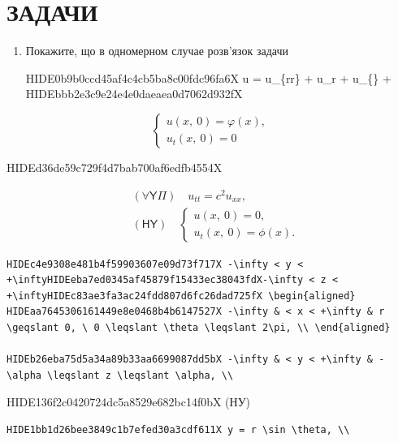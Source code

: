 \documentclass[
  ukrainian,
]{article}
\begin{document}
\section{ЗАДАЧИ}\label{ux437ux430ux434ux430ux447ux438-7}

\begin{enumerate}
\def\labelenumi{\arabic{enumi}.}
\item
  Покажите, що в одномерном случае розв'язок задачи

  HIDE0b9b0ccd45af4c4cb5ba8c00fdc96fa6X \Delta u = u\_\{rr\} +
  u\_r + u\_\{\theta\theta\} +
  HIDEbbb2e3c9e24e4e0daeaea0d7062d932fX
\end{enumerate}

\[
\begin{cases} u(x, \ 0) = \varphi(x), \\ u_t(x, \ 0) = 0 \end{cases}
\]

HIDEd36de59c729f4d7bab700af6edfb4554X

\[
\begin{aligned} & (\forall \mathsf{Y}\Pi) \quad u_{tt} = c^2 u_{xx}, \\ & (\mathsf{H} \mathsf{Y}) \quad \begin{cases} u\left(x, \ 0\right) = 0, \\ u_t\left(x, \ 0\right) = \phi\left(x\right). \end{cases} \end{aligned}
\]

\begin{verbatim}
HIDEc4e9308e481b4f59903607e09d73f717X -\infty < y < +\inftyHIDEeba7ed0345af45879f15433ec38043fdX-\infty < z < +\inftyHIDEc83ae3fa3ac24fdd807d6fc26dad725fX \begin{aligned}
HIDEaa7645306161449e8e0468b4b6147527X -\infty & < x < +\infty & r \geqslant 0, \ 0 \leqslant \theta \leqslant 2\pi, \\ \end{aligned}

HIDEb26eba75d5a34a89b33aa6699087dd5bX -\infty & < y < +\infty & -\alpha \leqslant z \leqslant \alpha, \\
\end{verbatim}

HIDE136f2c0420724dc5a8529e682bc14f0bX (НУ)

\begin{verbatim}
HIDE1bb1d26bee3849c1b7efed30a3cdf611X y = r \sin \theta, \\
\end{verbatim}
\end{document}
